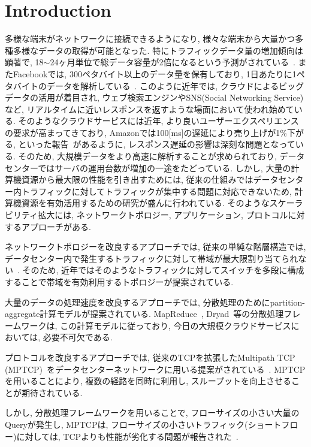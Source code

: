 \documentclass[10pt, a4paper, twocolumn]{jsarticle}
\begin{document}
\section{Introduction}
\label{sec:intro}

多様な端末がネットワークに接続できるようになり, 様々な端末から大量かつ多種多様なデータの取得が可能となった.
特にトラフィックデータ量の増加傾向は顕著で, 18$\sim$24ヶ月単位で総データ容量が2倍になるという予測がされている~\cite{IBM_rep}.
またFacebookでは, 300ペタバイト以上のデータ量を保有しており, 1日あたりに1ペタバイトのデータを解析している~\cite{presto}.
このように近年では, クラウドによるビッグデータの活用が着目され, ウェブ検索エンジンやSNS(Social Networking Service)など,
リアルタイムに近いレスポンスを返すような場面において使われ始めている.
そのようなクラウドサービスには近年, より良いユーザーエクスペリエンスの要求が高まってきており,
Amazonでは100[ms]の遅延により売り上げが1\%下がる, といった報告~\cite{amazon}があるように, レスポンス遅延の影響は深刻な問題となっている.
そのため, 大規模データをより高速に解析することが求められており, データセンターではサーバの運用台数が増加の一途をたどっている.
しかし, 大量の計算機資源から最大限の性能を引き出すためには,
従来の仕組みではデータセンター内トラフィックに対してトラフィックが集中する問題に対応できないため,
計算機資源を有効活用するための研究が盛んに行われている\cite{mapreduce, dryad, fattree, bcube, vl2,
dctcp, improving, detail, p_fab}.
そのようなスケーラビリティ拡大には, ネットワークトポロジー, アプリケーション, プロトコルに対するアプローチがある.

ネットワークトポロジーを改良するアプローチでは, 従来の単純な階層構造では,
データセンター内で発生するトラフィックに対して帯域が最大限割り当てられない~\cite{fattree}.
そのため, 近年ではそのようなトラフィックに対してスイッチを多段に構成することで帯域を有効利用するトポロジーが提案されている.

大量のデータの処理速度を改良するアプローチでは,
分散処理のためにpartition-aggregate計算モデルが提案されている.
MapReduce~\cite{mapreduce}, Dryad~\cite{dryad}等の分散処理フレームワークは,
この計算モデルに従っており, 今日の大規模クラウドサービスにおいては, 必要不可欠である.

プロトコルを改良するアプローチでは,
従来のTCPを拡張したMultipath TCP
(MPTCP)~\cite{mptcp}をデータセンターネットワークに用いる提案がされている~\cite{fattree,bcube,vl2}.
MPTCPを用いることにより, 複数の経路を同時に利用し, スループットを向上させることが期待されている.

しかし, 分散処理フレームワークを用いることで, フローサイズの小さい大量のQueryが発生し, MPTCPは,
フローサイズの小さいトラフィック(ショートフロー)に対しては, TCPよりも性能が劣化する問題が報告された~\cite{improving}.
\end{document}
